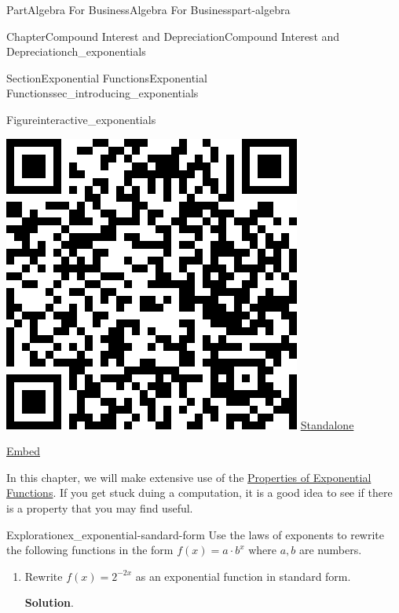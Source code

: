 \documentclass{tufte-book}
\newcommand{\blocktitlefont}{\relax}
\numberwithin{equation}{chapter}
\begin{document}
\begin{partptx}{Part}{Algebra For Business}{}{Algebra For Business}{}{}{part-algebra}
\begin{chapterptx}{Chapter}{Compound Interest and Depreciation}{}{Compound Interest and Depreciation}{}{}{ch_exponentials}
\begin{sectionptx}{Section}{Exponential Functions}{}{Exponential Functions}{}{}{sec_introducing_exponentials}
\begin{figureptx}{Figure}{}{interactive_exponentials}{}
\begin{sidebyside}{2}{0.075}{0.075}{0.17}
\begin{sbspanel}{0.21}
\includegraphics[width=\linewidth]{generated/qrcode/interactive_exponentials-1.png}
\href{http://webwork.bridgew.edu/oer/functions_at_work/interactive_exponentials-1.html}{Standalone}%
\par
\href{http://webwork.bridgew.edu/oer/functions_at_work/interactive_exponentials-1-if.html}{Embed}%
\end{sbspanel}%
\end{sidebyside}%
\tcblower
\end{figureptx}%
In this chapter, we will make extensive use of the \hyperref[exponential-arithmetic]{Properties of Exponential Functions}. If you get stuck duing a computation, it is a good idea to see if there is a property that you may find useful.%
\begin{exploration}{Exploration}{}{ex_exponential-sandard-form}%
Use the laws of exponents to rewrite the following functions in the form \(f(x) = a \cdot b^x\) where \(a,b\) are numbers.%
\begin{enumerate}[font=\bfseries,label=(\alph*),ref=\alph*]%
\item{}Rewrite \(f(x) = 2^{-2x}\) as an exponential function in standard form.%
\par\smallskip%
\noindent\textbf{\blocktitlefont Solution}.\hypertarget{ex_exponential-sandard-form-2-2}{}\quad{}%
\begin{align*}

\end{align*}
\end{enumerate}
\end{exploration}
\end{sectionptx}
\end{chapterptx}
\end{partptx}
\end{document}
